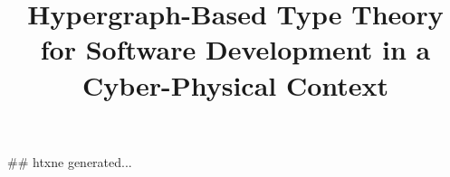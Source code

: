 ## htxne generated...
\title{
Hypergraph-Based Type Theory 
for Software Development in a Cyber-Physical Context}

